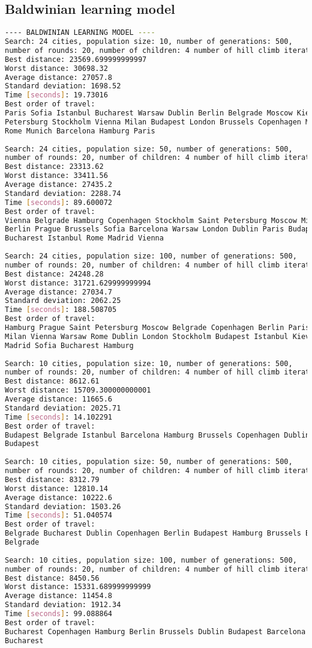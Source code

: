 \documentclass{article}
\begin{document}
\subsection{Baldwinian learning model}
\begin{lstlisting}[language=bash]
---- BALDWINIAN LEARNING MODEL ----
Search: 24 cities, population size: 10, number of generations: 500, 
number of rounds: 20, number of children: 4 number of hill climb iterations: 3: 
Best distance: 23569.699999999997
Worst distance: 30698.32
Average distance: 27057.8
Standard deviation: 1698.52
Time [seconds]: 19.73016
Best order of travel: 
Paris Sofia Istanbul Bucharest Warsaw Dublin Berlin Belgrade Moscow Kiev Saint 
Petersburg Stockholm Vienna Milan Budapest London Brussels Copenhagen Madrid 
Rome Munich Barcelona Hamburg Paris
 
Search: 24 cities, population size: 50, number of generations: 500, 
number of rounds: 20, number of children: 4 number of hill climb iterations: 3: 
Best distance: 23313.62
Worst distance: 33411.56
Average distance: 27435.2
Standard deviation: 2288.74
Time [seconds]: 89.600072
Best order of travel: 
Vienna Belgrade Hamburg Copenhagen Stockholm Saint Petersburg Moscow Milan Kiev 
Berlin Prague Brussels Sofia Barcelona Warsaw London Dublin Paris Budapest 
Bucharest Istanbul Rome Madrid Vienna
 
Search: 24 cities, population size: 100, number of generations: 500, 
number of rounds: 20, number of children: 4 number of hill climb iterations: 3: 
Best distance: 24248.28
Worst distance: 31721.629999999994
Average distance: 27034.7
Standard deviation: 2062.25
Time [seconds]: 188.508705
Best order of travel: 
Hamburg Prague Saint Petersburg Moscow Belgrade Copenhagen Berlin Paris Brussels 
Milan Vienna Warsaw Rome Dublin London Stockholm Budapest Istanbul Kiev Barcelona 
Madrid Sofia Bucharest Hamburg
 
Search: 10 cities, population size: 10, number of generations: 500, 
number of rounds: 20, number of children: 4 number of hill climb iterations: 3: 
Best distance: 8612.61
Worst distance: 15709.300000000001
Average distance: 11665.6
Standard deviation: 2025.71
Time [seconds]: 14.102291
Best order of travel: 
Budapest Belgrade Istanbul Barcelona Hamburg Brussels Copenhagen Dublin Berlin 
Budapest
 
Search: 10 cities, population size: 50, number of generations: 500, 
number of rounds: 20, number of children: 4 number of hill climb iterations: 3: 
Best distance: 8312.79
Worst distance: 12810.14
Average distance: 10222.6
Standard deviation: 1503.26
Time [seconds]: 51.040574
Best order of travel: 
Belgrade Bucharest Dublin Copenhagen Berlin Budapest Hamburg Brussels Barcelona 
Belgrade
 
Search: 10 cities, population size: 100, number of generations: 500, 
number of rounds: 20, number of children: 4 number of hill climb iterations: 3: 
Best distance: 8450.56
Worst distance: 15331.689999999999
Average distance: 11454.8
Standard deviation: 1912.34
Time [seconds]: 99.088864
Best order of travel: 
Bucharest Copenhagen Hamburg Berlin Brussels Dublin Budapest Barcelona Belgrade 
Bucharest

\end{lstlisting}
\end{document}
